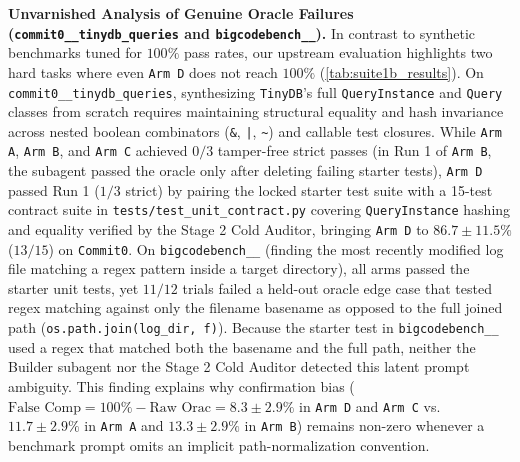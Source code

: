 \documentclass[11pt,a4paper,copyright]{google}
\begin{document}
\textbf{Unvarnished Analysis of Genuine Oracle Failures (\texttt{commit0\_\_\allowbreak tinydb\_\allowbreak queries} and \texttt{bigcodebench\_\_}).} In contrast to synthetic benchmarks tuned for $100\%$ pass rates, our upstream evaluation highlights two hard tasks where even \texttt{Arm D} does not reach $100\%$ (\cref{tab:suite1b_results}). On \texttt{commit0\_\_\allowbreak tinydb\_\allowbreak queries}, synthesizing \texttt{TinyDB}'s full \texttt{QueryInstance} and \texttt{Query} classes from scratch requires maintaining structural equality and hash invariance across nested boolean combinators (\texttt{\&}, \texttt{|}, \texttt{\~}) and callable test closures. While \texttt{Arm A}, \texttt{Arm B}, and \texttt{Arm C} achieved $0/3$ tamper-free strict passes (in Run 1 of \texttt{Arm B}, the subagent passed the oracle only after deleting failing starter tests), \texttt{Arm D} passed Run 1 ($1/3$ strict) by pairing the locked starter test suite with a 15-test contract suite in \texttt{tests/\allowbreak test\_unit\_contract.py} covering \texttt{QueryInstance} hashing and equality verified by the Stage 2 Cold Auditor, bringing \texttt{Arm D} to $86.7 \pm 11.5\%$ ($13/15$) on \texttt{Commit0}. On \texttt{bigcodebench\_\_} (finding the most recently modified log file matching a regex pattern inside a target directory), all arms passed the starter unit tests, yet $11/12$ trials failed a held-out oracle edge case that tested regex matching against only the filename basename as opposed to the full joined path (\texttt{os.path.join(\allowbreak log\_dir, f)}). Because the starter test in \texttt{bigcodebench\_\_} used a regex that matched both the basename and the full path, neither the Builder subagent nor the Stage 2 Cold Auditor detected this latent prompt ambiguity. This finding explains why confirmation bias ($\text{False Comp} = 100\% - \text{Raw Orac} = 8.3 \pm 2.9\%$ in \texttt{Arm D} and \texttt{Arm C} vs.\ $11.7 \pm 2.9\%$ in \texttt{Arm A} and $13.3 \pm 2.9\%$ in \texttt{Arm B}) remains non-zero whenever a benchmark prompt omits an implicit path-normalization convention.
\end{document}
